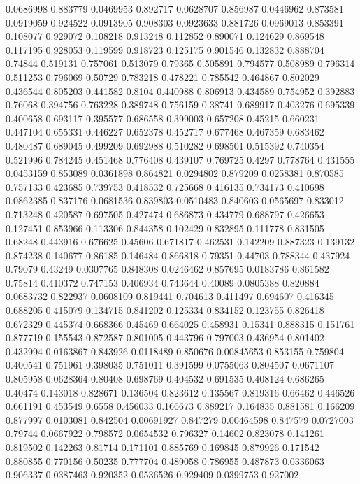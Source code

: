0.0686998 0.883779
0.0469953 0.892717
0.0628707 0.856987
0.0446962 0.873581
0.0919059 0.924522
0.0913905 0.908303
0.0923633 0.881726
0.0969013 0.853391
0.108077 0.929072
0.108218 0.913248
0.112852 0.890071
0.124629 0.869548
0.117195 0.928053
0.119599 0.918723
0.125175 0.901546
0.132832 0.888704
0.74844 0.519131
0.757061 0.513079
0.79365 0.505891
0.794577 0.508989
0.796314 0.511253
0.796069 0.50729
0.783218 0.478221
0.785542 0.464867
0.802029 0.436544
0.805203 0.441582
0.8104 0.440988
0.806913 0.434589
0.754952 0.392883
0.76068 0.394756
0.763228 0.389748
0.756159 0.38741
0.689917 0.403276
0.695339 0.400658
0.693117 0.395577
0.686558 0.399003
0.657208 0.45215
0.660231 0.447104
0.655331 0.446227
0.652378 0.452717
0.677468 0.467359
0.683462 0.480487
0.689045 0.499209
0.692988 0.510282
0.698501 0.515392
0.740354 0.521996
0.784245 0.451468
0.776408 0.439107
0.769725 0.4297
0.778764 0.431555
0.0453159 0.853089
0.0361898 0.864821
0.0294802 0.879209
0.0258381 0.870585
0.757133 0.423685
0.739753 0.418532
0.725668 0.416135
0.734173 0.410698
0.0862385 0.837176
0.0681536 0.839803
0.0510483 0.840603
0.0565697 0.833012
0.713248 0.420587
0.697505 0.427474
0.686873 0.434779
0.688797 0.426653
0.127451 0.853966
0.113306 0.844358
0.102429 0.832895
0.111778 0.831505
0.68248 0.443916
0.676625 0.45606
0.671817 0.462531
0.142209 0.887323
0.139132 0.874238
0.140677 0.86185
0.146484 0.866818
0.79351 0.44703
0.788344 0.437924
0.79079 0.43249
0.0307765 0.848308
0.0246462 0.857695
0.0183786 0.861582
0.75814 0.410372
0.747153 0.406934
0.743644 0.40089
0.0805388 0.820884
0.0683732 0.822937
0.0608109 0.819441
0.704613 0.411497
0.694607 0.416345
0.688205 0.415079
0.134715 0.841202
0.125334 0.834152
0.123755 0.826418
0.672329 0.445374
0.668366 0.45469
0.664025 0.458931
0.15341 0.888315
0.151761 0.877719
0.155543 0.872587
0.801005 0.443796
0.797003 0.436954
0.801402 0.432994
0.0163867 0.843926
0.0118489 0.850676
0.00845653 0.853155
0.759804 0.400541
0.751961 0.398035
0.751011 0.391599
0.0755063 0.804507
0.0671107 0.805958
0.0628364 0.80408
0.698769 0.404532
0.691535 0.408124
0.686265 0.40474
0.143018 0.828671
0.136504 0.823612
0.135567 0.819316
0.66462 0.446526
0.661191 0.453549
0.6558 0.456033
0.166673 0.889217
0.164835 0.881581
0.166209 0.877997
0.0103081 0.842504
0.00691927 0.847279
0.00464598 0.847579
0.0727003 0.79744
0.0667922 0.798572
0.0654532 0.796327
0.14602 0.823078
0.141261 0.819502
0.142263 0.81714
0.171101 0.885769
0.169845 0.879926
0.171542 0.880855
0.770156 0.50235
0.777704 0.489058
0.786955 0.487873
0.0336063 0.906337
0.0387463 0.920352
0.0536526 0.929409
0.0399753 0.927002
